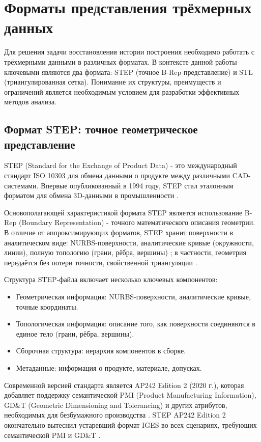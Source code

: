 
\section{Форматы представления трёхмерных данных}

Для решения задачи восстановления истории построения необходимо работать с трёхмерными данными в различных форматах. В контексте данной работы ключевыми являются два формата: STEP (точное B-Rep представление) и STL (триангулированная сетка). Понимание их структуры, преимуществ и ограничений является необходимым условием для разработки эффективных методов анализа.

\subsection{Формат STEP: точное геометрическое представление}

STEP (Standard for the Exchange of Product Data) - это международный стандарт ISO 10303 для обмена данными о продукте между различными CAD-системами. Впервые опубликованный в 1994 году, STEP стал эталонным форматом для обмена 3D-данными в промышленности \cite{cadinterop2023}.

Основополагающей характеристикой формата STEP является использование B-Rep (Boundary Representation) - точного математического описания геометрии. В отличие от аппроксимирующих форматов, STEP хранит поверхности в аналитическом виде: NURBS-поверхности, аналитические кривые (окружности, линии), полную топологию (грани, рёбра, вершины) \cite{techsoft3d_step}; в частности, геометрия передаётся без потери точности, свойственной триангуляции \cite{bigrep2026}.

Структура STEP-файла включает несколько ключевых компонентов:
\begin{itemize}
\item Геометрическая информация: NURBS-поверхности, аналитические кривые, точные координаты.
\item Топологическая информация: описание того, как поверхности соединяются в единое тело (грани, рёбра, вершины).
\item Сборочная структура: иерархия компонентов в сборке.
\item Метаданные: информация о продукте, материале, допусках.
\end{itemize}

Современной версией стандарта является AP242 Edition 2 (2020 г.), которая добавляет поддержку семантической PMI (Product Manufacturing Information), GD\&T (Geometric Dimensioning and Tolerancing) и других атрибутов, необходимых для безбумажного производства \cite{rapidpipeline2026, 3dexperience_step}. STEP AP242 Edition 2 окончательно вытеснил устаревший формат IGES во всех сценариях, требующих семантической PMI и GD\&T \cite{3dviewstation2022}.

